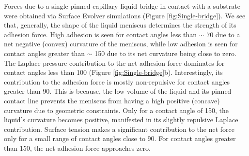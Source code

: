 \documentclass[vruler,JEB]{COB}%
\providecommand{\DIFadd}[1]{{\protect\color{blue}\uwave{#1}}} %
\providecommand{\DIFaddbegin}{} %
\providecommand{\DIFaddend}{} %
\begin{document}
Forces due to a single pinned capillary liquid bridge in contact with
a substrate were obtained via Surface Evolver simulations (Figure \ref{fig:Single-bridge}).
We see that, generally, the shape of the liquid meniscus determines
the strength of its adhesion force. High adhesion \DIFaddbegin \DIFadd{(> 60 \% of maximum) }\DIFaddend is seen for contact
angles less than $\sim$ 70\textdegree{} due to a net negative (convex) curvature
of the meniscus, while low adhesion \DIFaddbegin \DIFadd{(< 10 \% of maximum) }\DIFaddend is seen for contact angles greater
than $\sim$ 150\textdegree{} due to its net curvature being close
to zero. The Laplace pressure contribution to the net adhesion force
dominates for contact angles less than 100\textdegree{} (Figure \ref{fig:Single-bridge}b).
Interestingly, its contribution to the adhesion force is mostly non-repulsive
for contact angles greater than 90\textdegree . This is because, the
low volume of the liquid and its pinned contact line prevents the
meniscus from having a high positive (concave) curvature due to geometric constraints.
Only for a contact angle of 150\textdegree , the liquid's curvature
becomes positive, manifested in its slightly repulsive Laplace contribution.
Surface tension makes a significant contribution to the net force
only for a small range of contact angles close to 90\textdegree .
For contact angles greater than 150\textdegree , the net adhesion
force approaches zero.
\end{document}
